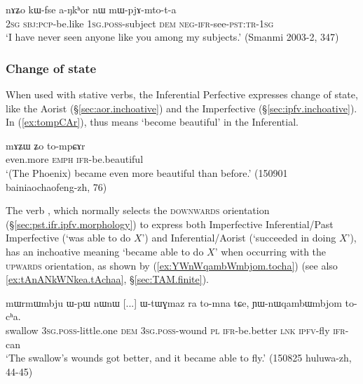 \begin{exe}
\ex \label{ex:aNkhoR.mWpjAmtota}
\gll nɤʑo kɯ-fse a-ŋkʰor nɯ mɯ-pjɤ-mto-t-a \\
\textsc{2sg} \textsc{sbj}:\textsc{pcp}-be.like \textsc{1sg}.\textsc{poss}-subject \textsc{dem} \textsc{neg}-\textsc{ifr}-see-\textsc{pst}:\textsc{tr}-\textsc{1sg} \\
\glt `I have never seen anyone like you among my subjects.' (Smanmi 2003-2, 347)
\end{exe}


\subsubsection{Change of state}   \label{sec:ifr.inchoative}
When used with stative verbs, the Inferential Perfective expresses change of state, like the Aorist (§\ref{sec:aor.inchoative}) and the Imperfective (§\ref{sec:ipfv.inchoative}). In (\ref{ex:tompCAr}),  thus means `become beautiful' in the Inferential.

\begin{exe}
\ex \label{ex:tompCAr}
\gll mɤʑɯ ʑo to-mpɕɤr \\
even.more \textsc{emph} \textsc{ifr}-be.beautiful \\
\glt `(The Phoenix) became even more beautiful than before.' (150901 bainiaochaofeng-zh, 76)
\end{exe}

The verb , which normally selects the \textsc{downwards} orientation (§\ref{sec:pst.ifr.ipfv.morphology}) to express both Imperfective Inferential/Past Imperfective (`was able to do $X$') and Inferential/Aorist (`succeeded in doing $X$'), has an inchoative meaning `became able to do $X$' when occurring with the \textsc{upwards} orientation, as shown by (\ref{ex:YWnWqambWmbjom.tocha}) (see also \ref{ex:tAnANkWNkea.tAchaa}, §\ref{sec:TAM.finite}).

\begin{exe}
\ex \label{ex:YWnWqambWmbjom.tocha}
\gll mɯrmɯmbju ɯ-pɯ nɯnɯ [...] ɯ-tɯɣmaz ra to-mna tɕe, ɲɯ-nɯqambɯmbjom to-cʰa. \\
swallow \textsc{3sg}.\textsc{poss}-little.one \textsc{dem} { } \textsc{3sg}.\textsc{poss}-wound \textsc{pl} \textsc{ifr}-be.better \textsc{lnk} \textsc{ipfv}-fly \textsc{ifr}-can \\
\glt `The swallow's wounds got better, and it became able to fly.' (150825 huluwa-zh, 44-45)
\end{exe}

